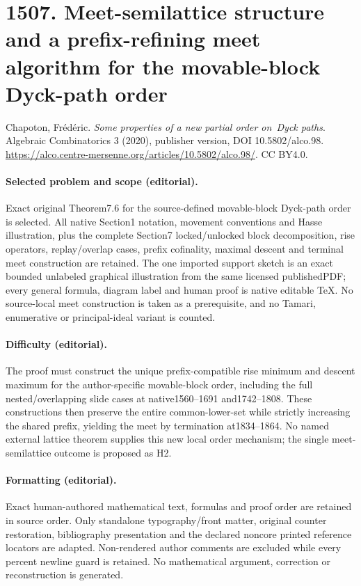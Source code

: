 \documentclass[10pt]{article}
\theoremstyle{definition}
\begin{document}
\section*{1507. Meet-semilattice structure and a prefix-refining meet algorithm for the movable-block Dyck-path order}
Chapoton, Frédéric. \emph{Some properties of a new partial order on Dyck paths}. Algebraic Combinatorics 3 (2020), publisher version, DOI 10.5802/alco.98. \url{https://alco.centre-mersenne.org/articles/10.5802/alco.98/}. CC BY4.0.
\paragraph{Selected problem and scope (editorial).} Exact original Theorem7.6 for the source-defined movable-block Dyck-path order is selected. All native Section1 notation, movement conventions and Hasse illustration, plus the complete Section7 locked/unlocked block decomposition, rise operators, replay/overlap cases, prefix cofinality, maximal descent and terminal meet construction are retained. The one imported support sketch is an exact bounded unlabeled graphical illustration from the same licensed publishedPDF; every general formula, diagram label and human proof is native editable TeX. No source-local meet construction is taken as a prerequisite, and no Tamari, enumerative or principal-ideal variant is counted.
\paragraph{Difficulty (editorial).} The proof must construct the unique prefix-compatible rise minimum and descent maximum for the author-specific movable-block order, including the full nested/overlapping slide cases at native1560–1691 and1742–1808. These constructions then preserve the entire common-lower-set while strictly increasing the shared prefix, yielding the meet by termination at1834–1864. No named external lattice theorem supplies this new local order mechanism; the single meet-semilattice outcome is proposed as H2.
\paragraph{Formatting (editorial).} Exact human-authored mathematical text, formulas and proof order are retained in source order. Only standalone typography/front matter, original counter restoration, bibliography presentation and the declared noncore printed reference locators are adapted. Non-rendered author comments are excluded while every percent newline guard is retained. No mathematical argument, correction or reconstruction is generated.
\clearpage
\end{document}
